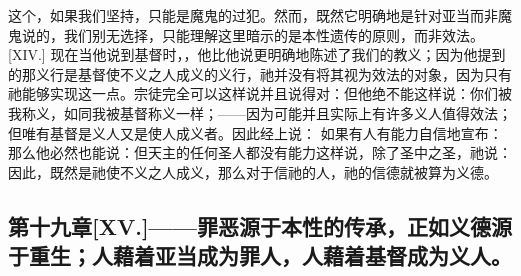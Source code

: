  这个，如果我们坚持，只能是魔鬼的过犯。然而，既然它明确地是针对亚当而非魔鬼说的，我们别无选择，只能理解这里暗示的是本性遗传的原则，而非效法。[XIV.] 现在当他说到基督时，，他比他说更明确地陈述了我们的教义；因为他提到的那义行是基督使不义之人成义的义行，祂并没有将其视为效法的对象，因为只有祂能够实现这一点。宗徒完全可以这样说并且说得对：但他绝不能这样说：你们被我称义，如同我被基督称义一样；——因为可能并且实际上有许多义人值得效法；但唯有基督是义人又是使人成义者。因此经上说： 如果有人有能力自信地宣布：那么他必然也能说：但天主的任何圣人都没有能力这样说，除了圣中之圣，祂说： 因此，既然是祂使不义之人成义，那么对于信祂的人，祂的信德就被算为义德。\par


\subsection{第十九章[XV.]——罪恶源于本性的传承，正如义德源于重生；人藉着亚当成为罪人，人藉着基督成为义人。}

